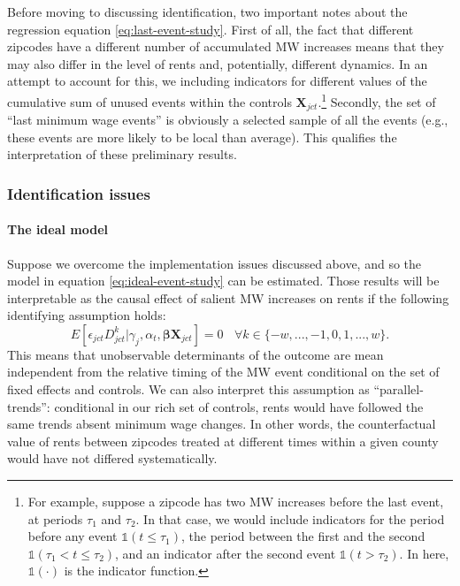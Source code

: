     Before moving to discussing identification, two important notes about the regression equation \eqref{eq:last-event-study}. First of all, the fact that different zipcodes have a different number of accumulated MW increases means that they may also differ in the level of rents and, potentially, different dynamics. In an attempt to account for this, we including indicators for different values of the cumulative sum of unused events within the controls $\boldsymbol{X}_{jct}$.\footnote{For example, suppose a zipcode has two MW increases before the last event, at periods $\tau_1$ and $\tau_2$. In that case, we would include indicators for the period before any event $\mathds{1}\left(t \leq \tau_1\right)$, the period between the first and the second $\mathds{1}\left(\tau_1 <  t \leq \tau_2 \right)$, and an indicator after the second event $\mathds{1}\left(t > \tau_2\right)$. In here, $\mathds{1} (\cdot)$ is the indicator function.} Secondly, the set of ``last minimum wage events'' is obviously a selected sample of all the events (e.g., these events are more likely to be local than average). This qualifies the interpretation of these preliminary results.

\subsubsection{Identification issues}
    
    \paragraph{The ideal model}
    
    Suppose we overcome the implementation issues discussed above, and so the model in equation \eqref{eq:ideal-event-study} can be estimated. Those results will be interpretable as the causal effect of salient MW increases on rents if the following identifying assumption holds: $$E \left[ \epsilon_{jct} D_{jct}^k \big| \gamma_j, \alpha_{t}, \boldsymbol{\beta} \boldsymbol{X}_{jct}\right]  = 0 \ \ \ \ \forall k\in\{-w, ..., -1, 0, 1, ..., w\}. $$ This means that unobservable determinants of the outcome are mean independent from the relative timing of the MW event conditional on the set of fixed effects and controls. We can also interpret this assumption as ``parallel-trends'': conditional in our rich set of controls, rents would have followed the same trends absent minimum wage changes. In other words, the counterfactual value of rents between zipcodes treated at different times within a given county would have not differed systematically.
    
